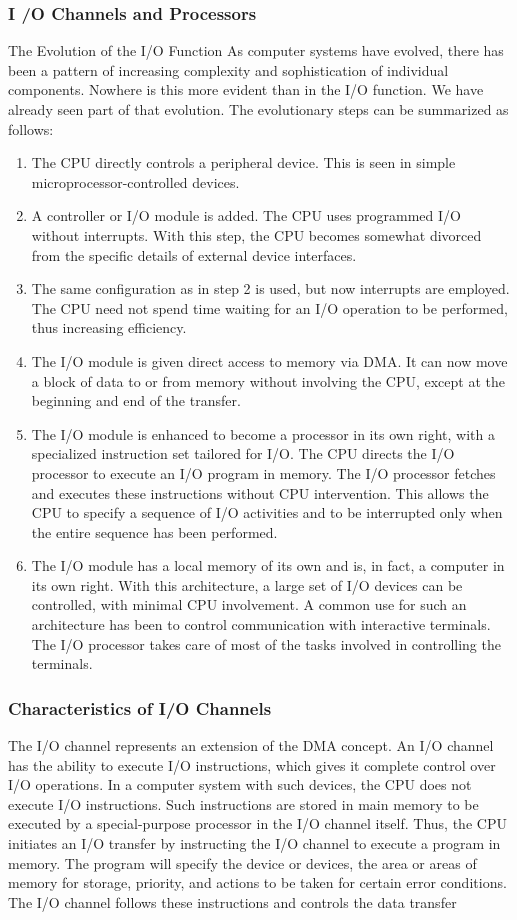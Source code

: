 \subsubsection{I /O Channels and Processors}
The Evolution of the I/O Function
As computer systems have evolved, there has been a pattern of increasing complexity
and sophistication of individual components. Nowhere is this more evident than
in the I/O function. We have already seen part of that evolution. The evolutionary
steps can be summarized as follows:
\begin{enumerate}
\item The CPU directly controls a peripheral device. This is seen in simple
microprocessor-controlled devices.
\item A controller or I/O module is added. The CPU uses programmed I/O without
interrupts. With this step, the CPU becomes somewhat divorced from the specific
details of external device interfaces.
\item  The same configuration as in step 2 is used, but now interrupts are employed.
The CPU need not spend time waiting for an I/O operation to be performed,
thus increasing efficiency.
\item The I/O module is given direct access to memory via DMA. It can now move
a block of data to or from memory without involving the CPU, except at the
beginning and end of the transfer.
\item  The I/O module is enhanced to become a processor in its own right, with a
specialized instruction set tailored for I/O. The CPU directs the I/O processor
to execute an I/O program in memory. The I/O processor fetches and executes
these instructions without CPU intervention. This allows the CPU to specify a
sequence of I/O activities and to be interrupted only when the entire sequence
has been performed.
\item The I/O module has a local memory of its own and is, in fact, a computer in its
own right. With this architecture, a large set of I/O devices can be controlled,
with minimal CPU involvement. A common use for such an architecture has
been to control communication with interactive terminals. The I/O processor
takes care of most of the tasks involved in controlling the terminals.
\end{enumerate}

\subsubsection{Characteristics of I/O Channels}
	The I/O channel represents an extension of the DMA concept. An I/O channel
	has the ability to execute I/O instructions, which gives it complete control over
	I/O operations. In a computer system with such devices, the CPU does not execute
	I/O instructions. Such instructions are stored in main memory to be executed by a
	special-purpose processor in the I/O channel itself. Thus, the CPU initiates an I/O
	transfer by instructing the I/O channel to execute a program in memory. The program
	will specify the device or devices, the area or areas of memory for storage,
	priority, and actions to be taken for certain error conditions. The I/O channel follows
	these instructions and controls the data transfer

